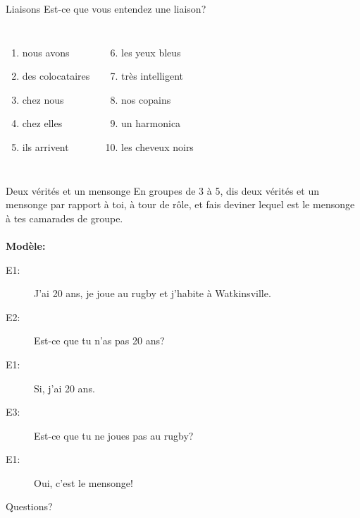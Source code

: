 \documentclass{beamer}
\begin{document}
  \begin{frame}{Liaisons}
    Est-ce que vous entendez une liaison?
    \begin{columns}
        \begin{enumerate}
          \item nous avons \underline{}
          \item des colocataires \underline{\uncover<3->{non}}
          \item chez nous \underline{}
          \item chez elles \underline{\uncover<5->{oui}}
          \item ils arrivent \underline{}
        \end{enumerate}
        \begin{enumerate}
          \setcounter{enumi}{5}
          \item les yeux bleus \underline{\uncover<7->{oui}}
          \item très intelligent \underline{}
          \item nos copains \underline{}
          \item un harmonica \underline{}
          \item les cheveux noirs \underline{}
        \end{enumerate}
    \end{columns}
  \end{frame}

  \begin{frame}{Deux vérités et un mensonge }
    En groupes de 3 à 5, dis deux vérités et un mensonge par rapport à toi, à tour de rôle, et fais deviner lequel est le mensonge à tes camarades de groupe. \\
     \\
    \textbf{Modèle:} \\
    \begin{description}
      \item[E1:] J'ai 20 ans, je joue au rugby et j'habite à Watkinsville.
      \item[] 
      \item[E2:] Est-ce que tu n'as pas 20 ans?
      \item[] 
      \item[E1:] Si, j'ai 20 ans.
      \item[] 
      \item[E3:] Est-ce que tu ne joues pas au rugby?
      \item[] 
      \item[E1:] Oui, c'est le mensonge!
      \item[] 
    \end{description}
  \end{frame}

  \begin{frame}{}
    \begin{center}
      \Large Questions?
    \end{center}
  \end{frame}
\end{document}
